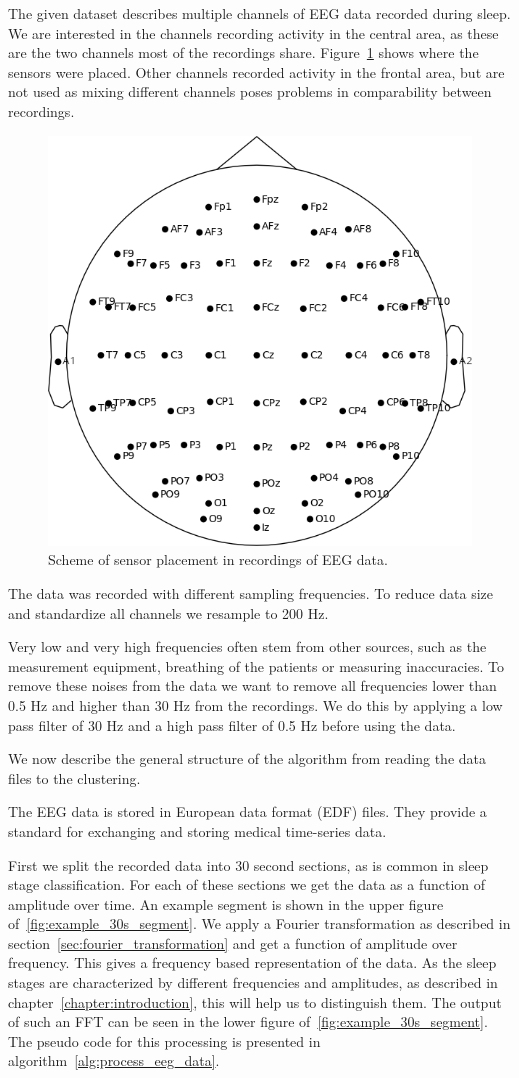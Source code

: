 The given dataset describes multiple channels of EEG data recorded during sleep. We are interested in the channels recording activity in the central area, as these are the two channels most of the recordings share. Figure~\ref{fig:head_placement} shows where the sensors were placed. Other channels recorded activity in the frontal area, but are not used as mixing different channels poses problems in comparability between recordings.

\begin{figure}[h]
	\centering
	\includegraphics[width=0.6\linewidth]{figs/head_placement}
	\caption{Scheme of sensor placement in recordings of EEG data.}
	\label{fig:head_placement}
\end{figure}

\newpage
The data was recorded with different sampling frequencies. To reduce data size and standardize all channels we resample to 200 Hz.

Very low and very high frequencies often stem from other sources, such as the measurement equipment, breathing of the patients or measuring inaccuracies. \color{change} To remove these noises from the data we want to remove all frequencies lower than 0.5 Hz and higher than 30 Hz from the recordings. We do this by applying a low pass filter of 30 Hz and a high pass filter of 0.5 Hz before using the data. \color{black}

We now describe the general structure of the algorithm from reading the data files to the clustering.

The EEG data is stored in European data format (EDF) files. They provide a standard for exchanging and storing medical time-series data.

First we split the recorded data into 30 second sections, as is common in sleep stage classification. For each of these sections we get the data as a function of amplitude over time. An example segment is shown in the upper figure of~\ref{fig:example_30s_segment}. We apply a Fourier transformation as described in section~\ref{sec:fourier_transformation} and get a function of amplitude over frequency. This gives a frequency based representation of the data. As the sleep stages are characterized by different frequencies and amplitudes, as described in chapter~\ref{chapter:introduction}, this will help us to distinguish them. The output of such an FFT can be seen in the lower figure of~\ref{fig:example_30s_segment}. The pseudo code for this processing is presented in algorithm~\ref{alg:process_eeg_data}.


